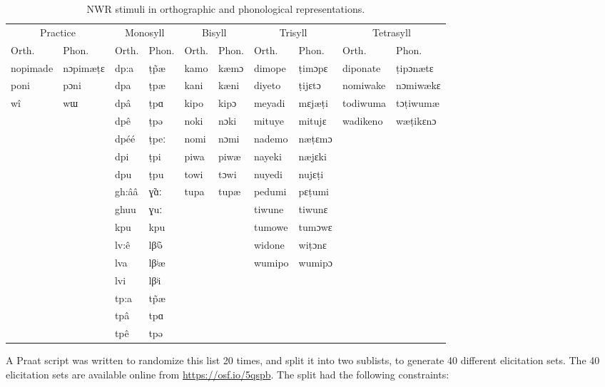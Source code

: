 \documentclass[english,,man,floatsintext]{apa6}
\begin{document}
\begin{table}

\caption{\label{tab:tab2-stims}NWR stimuli in orthographic and phonological representations.}
\centering
\begin{tabular}[t]{llllllllll}
\toprule
\multicolumn{2}{c}{Practice} & \multicolumn{2}{c}{Monosyll} & \multicolumn{2}{c}{Bisyll} & \multicolumn{2}{c}{Trisyll} & \multicolumn{2}{c}{Tetrasyll} \\
\cmidrule(l{3pt}r{3pt}){1-2} \cmidrule(l{3pt}r{3pt}){3-4} \cmidrule(l{3pt}r{3pt}){5-6} \cmidrule(l{3pt}r{3pt}){7-8} \cmidrule(l{3pt}r{3pt}){9-10}
Orth. & Phon. & Orth. & Phon. & Orth. & Phon. & Orth. & Phon. & Orth. & Phon.\\
\midrule
nopimade & nɔpimæṭɛ & dp:a & ṭp̃æ & kamo & kæmɔ & dimope & ṭimɔpɛ & diponate & ṭipɔnætɛ\\
poni & pɔni & dpa & ṭpæ & kani & kæni & diyeto & ṭijɛtɔ & nomiwake & nɔmiwækɛ\\
wî & wɯ & dpâ & ṭpɑ & kipo & kipɔ & meyadi & mɛjæṭi & todiwuma & tɔṭiwumæ\\
 &  & dpê & ṭpə & noki & nɔki & mituye & mitujɛ & wadikeno & wæṭikɛnɔ\\
 &  & dpéé & ṭpeː & nomi & nɔmi & nademo & næṭɛmɔ &  & \\
\addlinespace
 &  & dpi & ṭpi & piwa & piwæ & nayeki & næjɛki &  & \\
 &  & dpu & ṭpu & towi & tɔwi & nuyedi & nujɛṭi &  & \\
 &  & gh:ââ & ɣ̃ɑː & tupa & tupæ & pedumi & pɛṭumi &  & \\
 &  & ghuu & ɣuː &  &  & tiwune & tiwunɛ &  & \\
 &  & kpu & kpu &  &  & tumowe & tumɔwɛ &  & \\
\addlinespace
 &  & lv:ê & lβʲ̃ə &  &  & widone & wiṭɔnɛ &  & \\
 &  & lva & lβʲæ &  &  & wumipo & wumipɔ &  & \\
 &  & lvi & lβʲi &  &  &  &  &  & \\
 &  & tp:a & tp̃æ &  &  &  &  &  & \\
 &  & tpâ & tpɑ &  &  &  &  &  & \\
\addlinespace
 &  & tpê & tpə &  &  &  &  &  & \\
\bottomrule
\end{tabular}
\end{table}

A Praat script was written to randomize this list 20 times, and split it
into two sublists, to generate 40 different elicitation sets. The 40
elicitation sets are available online from \url{https://osf.io/5qspb}.
The split had the following constraints:
\end{document}
